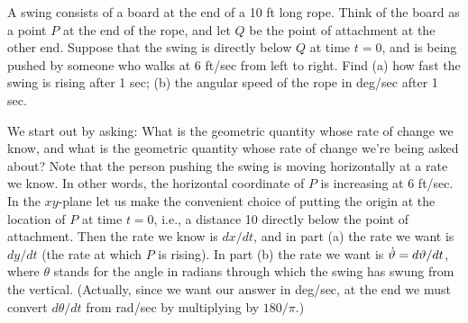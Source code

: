 \begin{example}
A swing consists of a board at the end of a 10 ft long rope.  Think of the
board as a point $P$ at the end of the rope, and let $Q$ be the point of
attachment at the other end.  Suppose that the swing is directly below $Q$
at time $t=0$, and is being pushed by someone who walks at 6
ft/sec from left to right.  Find (a) how fast the swing is rising after 1
sec; (b) the angular speed of the rope in deg/sec after 1 sec.

We  start out by asking: What is the geometric
quantity whose rate of change we know, and what is the geometric quantity
whose rate of change we're being asked about?  Note that the person pushing
the swing is moving horizontally at a rate we know.  In other words,
the  horizontal coordinate of $P$ is increasing at 6 ft/sec.  In the
$xy$-plane let us make the convenient choice of putting the origin at the
location of $P$ at time $t=0$, i.e., a distance 10 directly below the point
of attachment.  Then the rate we know is $dx/dt$, and in part 
(a) the rate we want is $dy/dt$ (the rate at which $P$ is rising).  In part
(b) the rate we want is $\displaystyle \dot{\vartheta}=d\vartheta/dt$, where $\theta$ stands for
the angle in radians through which the swing has swung from the vertical.
(Actually, since we want our answer in deg/sec, at the end we must convert
$d\theta/dt$ from rad/sec by multiplying by $180/\pi$.)



\end{example}

